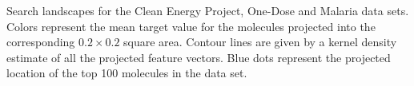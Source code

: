 Search landscapes for the Clean Energy Project, One-Dose and Malaria data sets.  
Colors represent the mean target value for the molecules projected into the corresponding $0.2 \times 0.2$ square area. Contour lines are given by a kernel density estimate of all the projected feature vectors. Blue dots represent the projected location of the top 100 molecules in the data set.
\label{fig:info_landscapes}